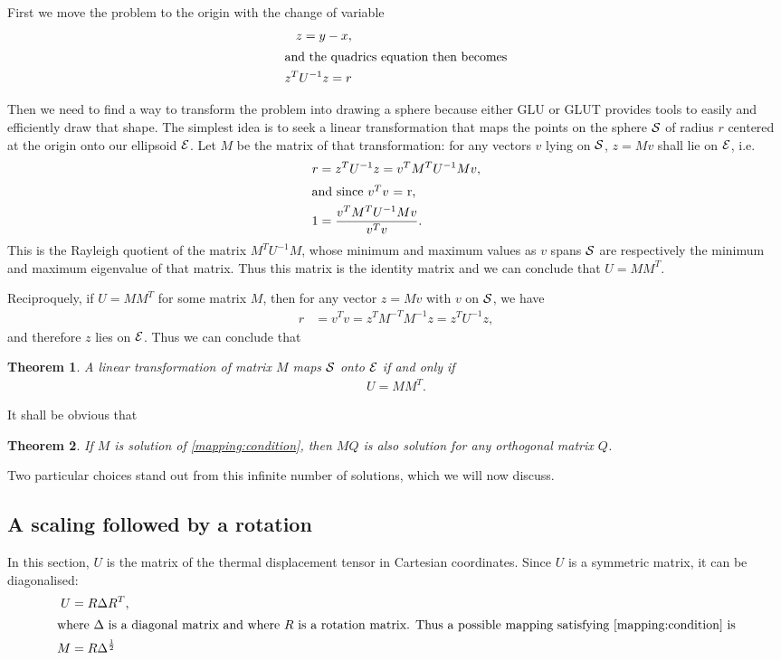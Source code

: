\documentclass[a4paper,11pt]{article}
\newtheorem{theorem}{Theorem}
\begin{document}
First we move the problem to the origin with the change of variable
\begin{align}
  z = y - x,\\
  \intertext{and the quadrics equation then becomes}
  z^T U^{-1} z = r
  \label{quadrics:at:orig}
\end{align}

Then we need to find a way to transform the problem into drawing a sphere because either GLU or GLUT provides tools to easily and efficiently draw that shape. The simplest idea is to seek a linear transformation that maps the points on the sphere $\cal S$ of radius $r$ centered at the origin onto our ellipsoid $\cal E$. Let $M$ be the matrix of that transformation: for any vectors $v$ lying on $\cal S$, $z=Mv$ shall lie on $\cal E$, i.e.
\begin{align}
  r &= z^T U^{-1} z = v^T M^T U^{-1} M v,\nonumber\\
  \intertext{and since $v^T v$ = r,}
  1 &= \frac{v^T M^T U^{-1} M v}{v^T v}\nonumber.
\end{align}
This is the Rayleigh quotient of the matrix $M^T U^{-1} M$, whose minimum and maximum values as $v$ spans $\cal S$ are respectively the minimum and maximum eigenvalue of that matrix. Thus this matrix is the identity matrix and we can conclude that $U=M M^T$.

Reciproquely, if $U=M M^T$ for some matrix $M$, then for any vector $z=Mv$ with $v$ on $\cal S$, we have
\begin{align}
  r &= v^T v = z^T M^{-T} M^{-1} z = z^T U^{-1} z,\nonumber
\end{align}
and therefore $z$ lies on $\cal E$. Thus we can conclude that
\begin{theorem}
  A linear transformation of matrix $M$ maps $\cal S$ onto $\cal E$ if and only if
  \begin{align}
    U = M M^T.
    \label{mapping:condition}
  \end{align}
\end{theorem}

It shall be obvious that
\begin{theorem}
  If $M$ is solution of \eqref{mapping:condition}, then $MQ$ is also solution for any orthogonal matrix $Q$.
\end{theorem}

Two particular choices stand out from this infinite number of solutions, which we will now discuss. 

\subsection{A scaling followed by a rotation}
In this section, $U$ is the matrix of the thermal displacement tensor in Cartesian coordinates.
Since $U$ is a symmetric matrix, it can be diagonalised:
\begin{align}
  U &= R \Delta R^T,\\
  \intertext{where $\Delta$ is a diagonal matrix and where $R$ is a rotation matrix. Thus a possible mapping satisfying \eqref{mapping:condition} is}
  M &= R \Delta^\frac{1}{2}
\end{align} 
 
\end{document}
